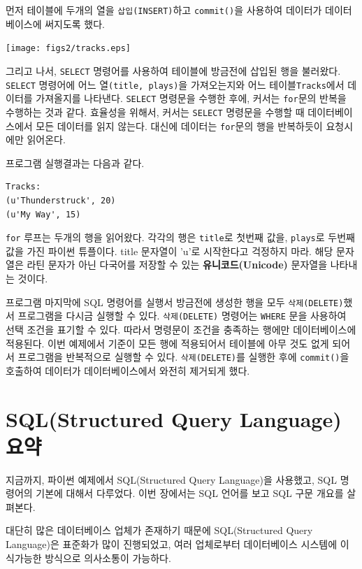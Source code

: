 먼저 테이블에 두개의 열을 {\tt 삽입(INSERT)}하고 {\tt commit()}을 사용하여 데이터가 데이터베이스에 써지도록 했다.

\beforefig
\centerline{\texttt{[image: figs2/tracks.eps]}}
\afterfig

그리고 나서, {\tt SELECT} 명령어를 사용하여 테이블에 방금전에 삽입된 행을 불러왔다.
{\tt SELECT} 명령어에 어느 열{\tt (title, plays)}을 가져오는지와 어느 테이블{\tt Tracks}에서 데이터를 가져올지를 나타낸다.
{\tt SELECT} 명령문을 수행한 후에, 커서는 {\tt for}문의 반복을 수행하는 것과 같다.
효율성을 위해서, 커서는 {\tt SELECT} 명령문을 수행할 때 데이터베이스에서 모든 데이터를 읽지 않는다. 
대신에 데이터는 {\tt for}문의 행을 반복하듯이 요청시에만 읽어온다.

프로그램 실행결과는 다음과 같다.

\beforeverb
\begin{verbatim}
Tracks:
(u'Thunderstruck', 20)
(u'My Way', 15)
\end{verbatim}
\afterverb
%

{\tt for} 루프는 두개의 행을 읽어왔다. 각각의 행은 {\tt title}로 첫번째 값을,
{\tt plays}로 두번째 값을 가진 파이썬 튜플이다. title 문자열이 'u'로 시작한다고 걱정하지 마라.
해당 문자열은 라틴 문자가 아닌 다국어를 저장할 수 있는 {\bf 유니코드(Unicode)} 문자열을 나타내는 것이다.

프로그램 마지막에 SQL 명령어를 실행서 방금전에 생성한 행을 모두 {\tt 삭제(DELETE)}했서
프로그램을 다시금 실행할 수 있다. {\tt 삭제(DELETE)} 명령어는 {\tt WHERE} 문을 사용하여 선택 조건을 표기할 수 있다.
따라서 명령문이 조건을 충족하는 행에만 데이터베이스에 적용된다.
이번 예제에서 기준이 모든 행에 적용되어서 테이블에 아무 것도 없게 되어서 프로그램을 반복적으로 실행할 수 있다.
{\tt 삭제(DELETE)}를 실행한 후에 {\tt commit()}을 호출하여 데이터가 데이터베이스에서 와전히 제거되게 했다.

\section{SQL(Structured Query Language) 요약}

지금까지, 파이썬 예제에서 SQL(Structured Query Language)을 사용했고, SQL 명령어의 기본에 대해서 다루었다.
이번 장에서는 SQL 언어를 보고 SQL 구문 개요를 살펴본다.

대단히 많은 데이터베이스 업체가 존재하기 때문에 SQL(Structured Query Language)은 표준화가 많이 진행되었고,
여러 업체로부터 데이터베이스 시스템에 이식가능한 방식으로 의사소통이 가능하다.

